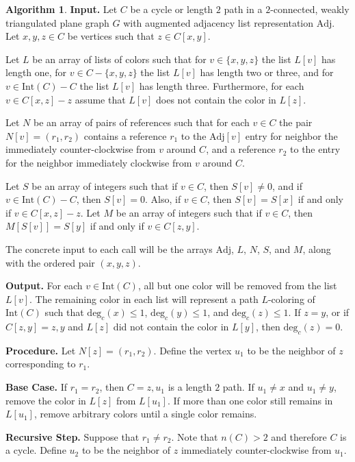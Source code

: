 \documentclass[12pt,letterpaper]{article}
\theoremstyle{plain}
\theoremstyle{definition}
\theoremstyle{break}
\newtheorem{algorithm}[lemma]{Algorithm}     %
\begin{document}
\begin{algorithm}\label{A:hartman_impl}
\textbf{Input.} Let $C$ be a cycle or length $2$ path in a
$2$-connected, weakly triangulated plane graph $G$
with augmented adjacency list representation
$\text{Adj}$. Let $x,y,z\in C$ be
vertices such that $z\in C[x,y]$.

Let $L$ be an array of lists of colors
such that for $v\in\{x,y,z\}$ the list $L[v]$ has length one,
for $v\in C-\{x,y,z\}$ the list $L[v]$ has length two
or three, and for $v\in \text{Int}(C)-C$ the list
$L[v]$ has length three. Furthermore, for each $v\in C[x,z] - z$ assume
that $L[v]$ does not contain the color in $L[z]$.

Let $N$ be an array of pairs of
references such that for each $v\in C$ the pair $N[v]=(r_1,r_2)$ contains
a reference $r_1$ to the $\text{Adj}[v]$ entry for neighbor the
immediately counter-clockwise
from $v$
around $C$, and a reference $r_2$
to the entry for the neighbor immediately clockwise from $v$ around $C$.

Let $S$ be an array of
integers such that if $v\in C$, then $S[v]\ne 0$, and if
$v\in \text{Int}(C)-C$, then $S[v]=0$. Also, if
$v\in C$, then $S[v]=S[x]$ if and only if $v\in C[x,z]-z$. Let $M$
be an array of integers such that if $v\in C$, then $M[S[v]]=S[y]$
if and only if $v\in C[z,y]$.

The concrete input to each call will be the arrays $\text{Adj}$, $L$,
$N$, $S$, and $M$, along with the ordered pair $(x,y,z)$.

\textbf{Output.} For each $v\in\text{Int}(C)$, all but one color will be
removed from the list $L[v]$. The remaining color in each list will represent
a path $L$-coloring of $\text{Int}(C)$
such that $\text{deg}_c(x)\le1$, $\text{deg}_c(y)\le1$, and
$\text{deg}_c(z)\le1$. If $z=y$, or if $C[z,y]=z,y$ and $L[z]$ did
not contain the color in $L[y]$, then $\text{deg}_c(z)=0$.

\textbf{Procedure.} Let $N[z]=(r_1,r_2)$. Define the vertex $u_1$ to be
the neighbor of $z$ corresponding to $r_1$.

\textbf{Base Case.} If $r_1=r_2$, then $C=z,u_1$
is a length $2$ path. If $u_1\ne x$ and $u_1\ne y$, remove the
color in $L[z]$ from $L[u_1]$. If more than one color still remains in
$L[u_1]$, remove arbitrary colors until a single color remains.

\textbf{Recursive Step.} Suppose that $r_1\ne r_2$. Note that
$n(C)>2$ and therefore $C$ is a cycle. Define $u_2$ to be the
neighbor of $z$ immediately counter-clockwise from $u_1$.


\end{algorithm}
\end{document}
